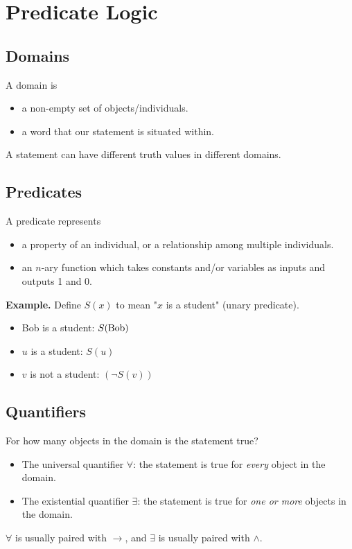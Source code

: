\documentclass[11pt]{article}
\theoremstyle{definition}
\begin{document}
\newpage
\section{Predicate Logic}
\subsection{Domains}
A domain is \vspace{-0.25cm}
\begin{itemize}
    \item a non-empty set of objects/individuals.
    \item a word that our statement is situated within.
\end{itemize}
\vspace{-0.25cm}
A statement can have different truth values in different domains.

\subsection{Predicates}
A predicate represents \vspace{-0.25cm}
\begin{itemize}
    \item a property of an individual, or a relationship among multiple individuals.
    \item an $n$-ary function which takes constants and/or variables as inputs and outputs 1 and 0.
\end{itemize}
\vspace{-0.25cm}
{\bf Example.} Define $S(x)$ to mean "$x$ is a student" (unary predicate). \vspace{-0.25cm}
\begin{itemize}
    \item Bob is a student: $S({\rm Bob})$
    \item $u$ is a student: $S(u)$
    \item $v$ is not a student: $(\neg S(v))$
\end{itemize}

\subsection{Quantifiers}
For how many objects in the domain is the statement true? \vspace{-0.25cm}
\begin{itemize}
    \item The universal quantifier $\forall$: the statement is true for {\it every} object in the domain.
    \item The existential quantifier $\exists$: the statement is true for {\it one or more} objects in the domain.
\end{itemize}
\vspace{-0.25cm}
$\forall$ is usually paired with $\rightarrow$, and $\exists$ is usually paired with $\wedge$.
\end{document}

